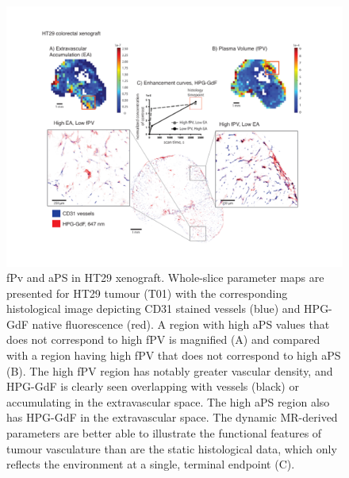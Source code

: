 \begin{figure}[htbp]
 \begin{center}
 \includegraphics[width=\textwidth]{hpg/hpg-paper1-images/hpg_fig5-ht29fpv.pdf}
 \caption{fPv and \acs{aPS} in HT29 xenograft.
 Whole-slice parameter maps are presented for HT29 tumour (T01) with the corresponding histological image depicting \acs{CD31} stained vessels (blue) and \acs{HPG-GdF} native fluorescence (red).
 A region with high \acs{aPS} values that does not correspond to high \acs{fPV} is magnified (A) and compared with a region having high \acs{fPV} that does not correspond to high \acs{aPS} (B).
 The high \acs{fPV} region has notably greater vascular density, and \acs{HPG-GdF} is clearly seen overlapping with vessels (black) or accumulating in the extravascular space.
 The high \acs{aPS} region also has \acs{HPG-GdF} in the extravascular space.
 The dynamic MR-derived parameters are better able to illustrate the functional features of tumour vasculature than are the static histological data, which only reflects the environment at a single, terminal endpoint (C).}
 \label{hpgpaper1:fig5}
 \end{center}
\end{figure}


